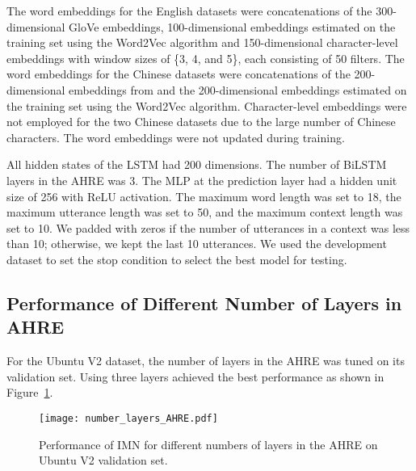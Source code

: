 \documentclass[sigconf]{acmart}
\begin{document}
    The word embeddings for the English datasets were concatenations of the 300-dimensional GloVe embeddings, 100-dimensional embeddings estimated on the training set using the Word2Vec algorithm and 150-dimensional character-level embeddings with window sizes of \{3, 4, and 5\}, each consisting of 50 filters.
    The word embeddings for the Chinese datasets were concatenations of the 200-dimensional embeddings from and the 200-dimensional embeddings estimated on the training set using the Word2Vec algorithm. Character-level embeddings were not employed for the two Chinese datasets due to the large number of Chinese characters. The word embeddings were not updated during training.

    All hidden states of the LSTM had 200 dimensions. The number of BiLSTM layers in the AHRE was 3.
    The MLP at the prediction layer had a hidden unit size of 256 with ReLU activation.
    The maximum word length was set to 18, the maximum utterance length was set to 50, and the maximum context length was set to 10. We padded with zeros if the number of utterances in a context was less than 10; otherwise, we kept the last 10 utterances.
    We used the development dataset to set the stop condition to select the best model for testing.



  \subsection{Performance of Different Number of Layers in AHRE}
    For the Ubuntu V2 dataset, the number of layers in the AHRE was tuned on its validation set. Using three layers achieved the best performance as shown in Figure~\ref{fig2}.
    \begin{figure}
    \centering
    \texttt{[image: number\_layers\_AHRE.pdf]}
    \caption{Performance of IMN for different numbers of layers in the AHRE on Ubuntu V2 validation set.}
    \label{fig2}
    \end{figure}
\end{document}
